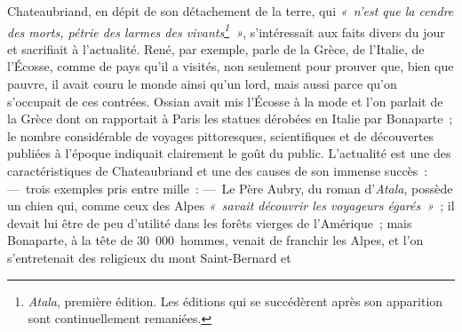 \documentclass[french,twoside]{book} %
\begin{document}
Chateaubriand, en dépit de son détachement de la terre, qui \emph{« n’est que la cendre des morts, pétrie des larmes des vivants\footnote{\emph{Atala}, première édition. Les éditions qui se succédèrent après son apparition sont continuellement remaniées.} »}, s’intéressait aux faits divers du jour et sacrifiait à l’actualité. René, par exemple, parle de la Grèce, de l’Italie, de l’Écosse, comme de pays qu’il a visités, non seulement pour prouver que, bien que pauvre, il avait couru le monde ainsi qu’un lord, mais aussi parce qu’on s’occupait de ces contrées. Ossian avait mis l’Écosse à la mode et l’on parlait de la Grèce dont on rapportait à Paris les statues dérobées en Italie par Bonaparte ; le nombre considérable de voyages pittoresques, scientifiques et de découvertes publiées à l’époque indiquait clairement le goût du public. L’actualité est une des caractéristiques de Chateaubriand et une des causes de son immense succès : — trois exemples pris entre mille : — Le Père Aubry, du roman d’\emph{Atala}, possède un chien qui, comme ceux des Alpes \emph{« savait découvrir les voyageurs égarés »} ; il devait lui être de peu d’utilité dans les forêts vierges de l’Amérique ; mais Bonaparte, à la tête de 30 000 hommes, venait de franchir les Alpes, et l’on s’entretenait des religieux du mont Saint-Bernard et  
\end{document}
